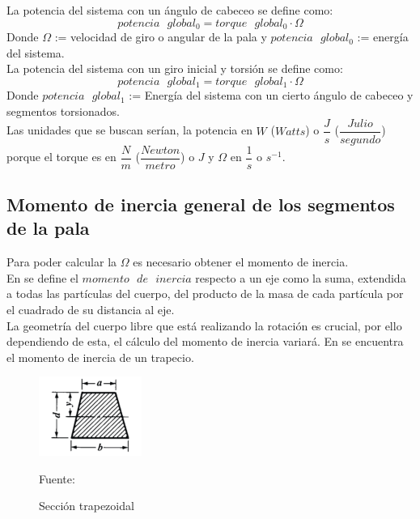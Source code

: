  
  La potencia del sistema con un ángulo de cabeceo se define como:
  \begin{equation}
  potencia \text{ } global_0 = torque \text{ } global_0 \cdot \Omega  
 \label{def:potencia_giro_inicial}
 \end{equation}
  Donde $\Omega$ := velocidad de giro o angular de la pala y $potencia \text{ } global_0$ := energía del sistema.\\
 
  La potencia del sistema con un giro inicial y torsión se define como:
   \begin{equation}
  potencia \text{ } global_1 = torque \text{ } global_1 \cdot \Omega  
 \label{def:potencia_giro_segmentos}
 \end{equation}
  Donde $potencia \text{ } global_1$ := Energía del sistema con un cierto ángulo de cabeceo y segmentos torsionados.\\
 
Las unidades que se buscan serían, la potencia en $W$ ($Watts$) o $\dfrac{J}{s}$ ($\dfrac{Julio}{segundo}$) porque el torque es en $\dfrac{N}{m}$ ($\dfrac{Newton}{metro}$) o $J$ y $\Omega$ en $\dfrac{1}{s}$ o $s^{-1}$.

 
\subsection{Momento de inercia general de los segmentos de la pala}

Para poder calcular la $\Omega$ es necesario obtener el momento de inercia.\\

En \cite[p.~269]{goldstein1987mecanica} se define el $momento \text{ } de \text{ } inercia$ respecto a un eje como la suma, extendida a todas las partículas del cuerpo, del producto de la masa de cada partícula por el cuadrado de su distancia al eje.\\


La geometría del cuerpo libre que está realizando la rotación es crucial, por ello dependiendo de esta, el cálculo del momento de inercia variará. En \cite[p.~242]{oberg2012machinery} se encuentra el momento de inercia de un trapecio. \\


\begin{figure}[H]
    \centering
    \includegraphics[width=0.3\textwidth]{images/trapecio libro machinery.png}
    \caption{Sección trapezoidal}
    Fuente: \cite[p.~242]{oberg2012machinery}
    \label{fig:momento_inercia_libro}
\end{figure}



